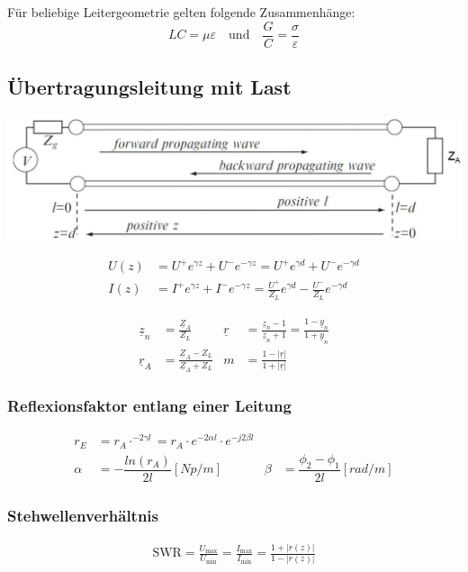 Für beliebige Leitergeometrie gelten folgende Zusammenhänge:
\[
    LC = \mu\varepsilon \quad \text{und} \quad \frac{G}{C} = \frac{\sigma}{\varepsilon}
\]

\subsection{Übertragungsleitung mit Last}

\includegraphics[width=\columnwidth]{Figures/UebertragungleitungmitLast.png}

\begin{align*}
    U(z) & = U^+ e^{\gamma z} + U^- e^{-\gamma z} = U^+ e^{\gamma d} + U^ - e^{-\gamma d}                      \\
    I(z) & = I^+ e^{\gamma z} + I^- e^{-\gamma z} = \frac{U^+}{Z_L}e^{\gamma d} - \frac{U^-}{Z_L}e^{-\gamma d}
\end{align*}

\begin{align*}
    \underline{z}_n & = \frac{\underline{Z}_A}{Z_L}                     & \underline{r} & = \frac{\underline{z}_n-1}{\underline{z}_n+1}= \frac{1-\underline{y}_n}{1+\underline{y}_n} \\
    \underline{r}_A & = \frac{\underline{Z}_A-Z_L}{\underline{Z}_A+Z_L} & m             & = \frac{1-|\underline{r}|}{1+|\underline{r}|}
\end{align*}
\subsubsection{Reflexionsfaktor entlang einer Leitung}
\begin{align*}
    r_E    & = r_A \cdot ^{-2\gamma l} = r_A \cdot e^{-2\alpha l}\cdot e^{-j2\beta l} \\
    \alpha & = -\dfrac{ln(r_A)}{2l} [Np/m] & \beta  & = \dfrac{\phi_2 -\phi_1}{2l} [rad/m]
\end{align*}

\subsubsection{Stehwellenverhältnis}
\begin{align*}
    \mathrm{SWR} = \frac{U_\text{max}}{U_\text{min}} =
    \frac{I_\text{max}}{I_\text{min}} = \frac{1+|r(z)|}{1-|r(z)|}
\end{align*}
